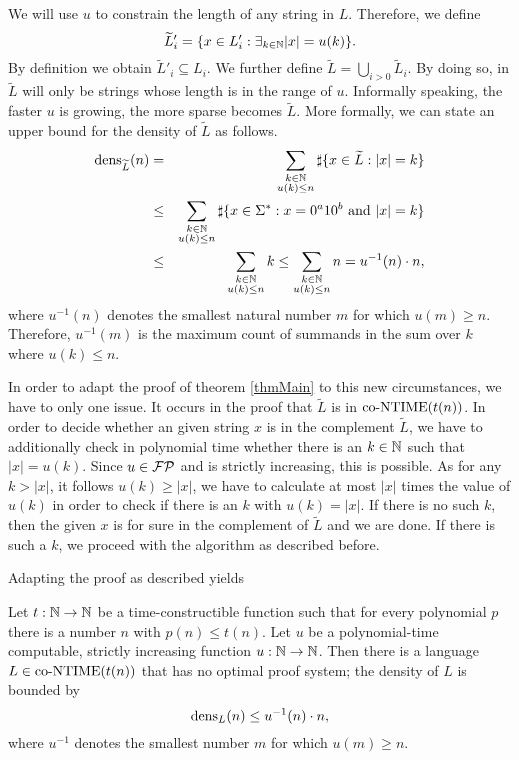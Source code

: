   We will use \(u\) to constrain the length of any string in \(L\). Therefore, we define
  \[
    \widetilde{L}'_i = \{ x \in L'_i : \exists_{k \in \mathbb{N}} |x| = u(k) \}. 
  \]
  By definition we obtain \(\widetilde{L}'_i \subseteq L_i\). We further define \(\widetilde{L} = \bigcup_{i>0} \widetilde{L}_i\). By doing so, in \(\widetilde{L}\) will only be strings whose length is in the range of \(u\). Informally speaking, the faster \(u\) is growing, the more sparse becomes \(\widetilde{L}\). More formally, we can state an upper bound for the density of \(\widetilde{L}\) as follows.
  \begin{eqnarray*}
    \operatorname{dens}_{\widetilde{L}}(n) 
    &=& \sum_{\substack{k \in \mathbb{N} \\ u(k) \leq n}} \sharp \{ x \in \widetilde{L} : |x| = k \} \\
    &\leq& \sum_{\substack{k \in \mathbb{N} \\ u(k) \leq n}} \sharp \{ x \in \Sigma^* : x = 0^a10^b \text{ and } |x| = k \} \\
    &\leq& \sum_{\substack{k \in \mathbb{N} \\ u(k) \leq n}} k
    \leq \sum_{\substack{k \in \mathbb{N} \\ u(k) \leq n}} n = u^{-1}(n) \cdot n,
  \end{eqnarray*}
  where \(u^{-1}(n)\) denotes the smallest natural number \(m\) for which \(u(m) \geq n\). Therefore, \(u^{-1}(m)\) is the maximum count of summands in the sum over \(k\) where \(u(k) \leq n\).

  In order to adapt the proof of theorem \ref{thmMain} to this new circumstances, we have to only one issue. It occurs in the proof that \(\widetilde{L}\) is in \(\text{co-NTIME}(t(n))\). In order to decide whether an given string \(x\) is in the complement \(\widetilde{L}\), we have to additionally check in polynomial time whether there is an \(k \in \mathbb{N}\) such that \(|x| = u(k)\). Since \(u \in \mathcal{FP}\) and is strictly increasing, this is possible. As for any \(k > |x|\), it follows \(u(k) \geq |x|\), we have to calculate at most \(|x|\) times the value of \(u(k)\) in order to check if there is an \(k\) with \(u(k) = |x|\). If there is no such \(k\), then the given \(x\) is for sure in the complement of \(\widetilde{L}\) and we are done. If there is such a \(k\), we proceed with the algorithm as described before.

  Adapting the proof as described yields
  
  \begin{corollary} \label{corSparse}
    Let \(t:\mathbb{N}\to\mathbb{N}\) be a time-constructible function such that for every polynomial \(p\) there is a number \(n\) with \(p(n) \leq t(n)\). Let \(u\) be a polynomial-time computable, strictly increasing function \(u:\mathbb{N}\to\mathbb{N}\). Then there is a language \(L \in \text{co-NTIME}(t(n))\) that has no optimal proof system; the density of \(L\) is bounded by 
    \[
     \operatorname{dens}_L(n) \leq u^{-1}(n) \cdot n,
    \]
    where \(u^{-1}\) denotes the smallest number \(m\) for which \(u(m) \geq n\).
  \end{corollary}


